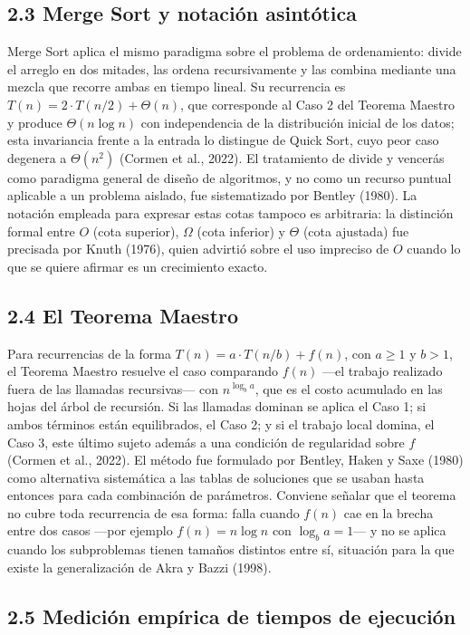 \documentclass[12pt,a4paper]{article}
\begin{document}
\subsection*{2.3 Merge Sort y notación asintótica}

Merge Sort aplica el mismo paradigma sobre el problema de ordenamiento: divide el
arreglo en dos mitades, las ordena recursivamente y las combina mediante una mezcla
que recorre ambas en tiempo lineal. Su recurrencia es
$T(n) = 2 \cdot T(n/2) + \Theta(n)$, que corresponde al Caso 2 del Teorema Maestro y
produce $\Theta(n \log n)$ con independencia de la distribución inicial de los datos;
esta invariancia frente a la entrada lo distingue de Quick Sort, cuyo peor caso
degenera a $\Theta(n^2)$ (Cormen et al., 2022). El tratamiento de divide y vencerás
como paradigma general de diseño de algoritmos, y no como un recurso puntual aplicable
a un problema aislado, fue sistematizado por Bentley (1980). La notación empleada para
expresar estas cotas tampoco es arbitraria: la distinción formal entre $O$ (cota
superior), $\Omega$ (cota inferior) y $\Theta$ (cota ajustada) fue precisada por Knuth
(1976), quien advirtió sobre el uso impreciso de $O$ cuando lo que se quiere afirmar
es un crecimiento exacto.

\subsection*{2.4 El Teorema Maestro}

Para recurrencias de la forma $T(n) = a \cdot T(n/b) + f(n)$, con $a \geq 1$ y $b > 1$,
el Teorema Maestro resuelve el caso comparando $f(n)$ ---el trabajo realizado fuera de
las llamadas recursivas--- con $n^{\log_b a}$, que es el costo acumulado en las hojas
del árbol de recursión. Si las llamadas dominan se aplica el Caso 1; si ambos términos
están equilibrados, el Caso 2; y si el trabajo local domina, el Caso 3, este último
sujeto además a una condición de regularidad sobre $f$ (Cormen et al., 2022). El método
fue formulado por Bentley, Haken y Saxe (1980) como alternativa sistemática a las tablas
de soluciones que se usaban hasta entonces para cada combinación de parámetros. Conviene
señalar que el teorema no cubre toda recurrencia de esa forma: falla cuando $f(n)$ cae
en la brecha entre dos casos ---por ejemplo $f(n) = n \log n$ con $\log_b a = 1$--- y no
se aplica cuando los subproblemas tienen tamaños distintos entre sí, situación para la
que existe la generalización de Akra y Bazzi (1998).

\subsection*{2.5 Medición empírica de tiempos de ejecución}
\end{document}
